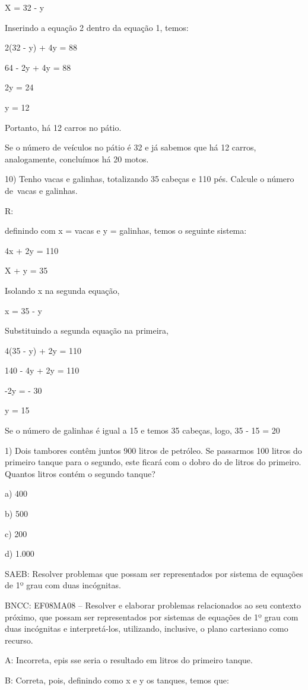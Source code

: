 X = 32 - y

Inserindo a equação 2 dentro da equação 1, temos:

2(32 - y) + 4y = 88

64 - 2y + 4y = 88

2y = 24

y = 12

Portanto, há 12 carros no pátio.

Se o número de veículos no pátio é 32 e já sabemos que há 12 carros,
analogamente, concluímos há 20 motos.

10) Tenho vacas e galinhas, totalizando 35 cabeças e 110 pés. Calcule o
número de~vacas e galinhas.

R:

definindo com x = vacas e y = galinhas, temos o seguinte sistema:

4x + 2y = 110

X + y = 35

Isolando x na segunda equação,

x = 35 - y

Substituindo a segunda equação na primeira,

4(35 - y) + 2y = 110

140 - 4y + 2y = 110

-2y = - 30

y = 15

Se o número de galinhas é igual a 15 e temos 35 cabeças, logo, 35 - 15 =
20


1) Dois tambores contêm juntos 900 litros de petróleo. Se passarmos 100
litros do primeiro tanque para o segundo, este ficará com o dobro do de
litros do primeiro. Quantos litros contém o segundo tanque?

a) 400

b) 500

c) 200

d) 1.000

SAEB: Resolver problemas que possam ser representados por sistema de
equações de 1º grau com duas incógnitas.

BNCC: EF08MA08 -- Resolver e elaborar problemas relacionados ao seu
contexto próximo, que possam ser representados por sistemas de equações
de 1º grau com duas incógnitas e interpretá-los, utilizando, inclusive,
o plano cartesiano como recurso.

A: Incorreta, epis sse seria o resultado em litros do primeiro tanque.

B: Correta, pois, definindo como x e y os tanques, temos que:

